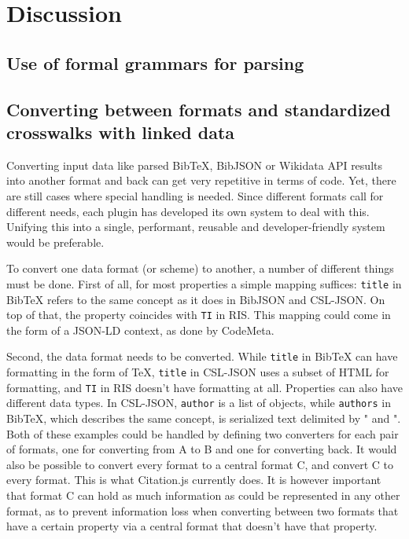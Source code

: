 \documentclass[fleqn,10pt,lineno]{wlpeerj} %
\begin{document}
\section*{Discussion}

\subsection*{Use of formal grammars for parsing}


\subsection*{Converting between formats and standardized crosswalks with linked data}

Converting input data like parsed BibTeX, BibJSON or Wikidata API results into another format and back can get very repetitive in terms of code. Yet, there are still cases where special handling is needed. Since different formats call for different needs, each plugin has developed its own system to deal with this. Unifying this into a single, performant, reusable and developer-friendly system would be preferable.

To convert one data format (or scheme) to another, a number of different things must be done. First of all, for most properties a simple mapping suffices: \texttt{title} in BibTeX refers to the same concept as it does in BibJSON and CSL-JSON. On top of that, the property coincides with \texttt{TI} in RIS. This mapping could come in the form of a JSON-LD context, as done by CodeMeta.

Second, the data format needs to be converted. While \texttt{title} in BibTeX can have formatting in the form of \TeX, \texttt{title} in CSL-JSON uses a subset of HTML for formatting, and \texttt{TI} in RIS doesn't have formatting at all. Properties can also have different data types. In CSL-JSON, \texttt{author} is a list of objects, while \texttt{authors} in BibTeX, which describes the same concept, is serialized text delimited by " and ". Both of these examples could be handled by defining two converters for each pair of formats, one for converting from A to B and one for converting back. It would also be possible to convert every format to a central format C, and convert C to every format. This is what Citation.js currently does. It is however important that format C can hold as much information as could be represented in any other format, as to prevent information loss when converting between two formats that have a certain property via a central format that doesn't have that property.
\end{document}
